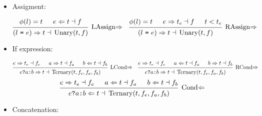 \documentclass{article}
\DeclareMathOperator{\Unary}{Unary}
\DeclareMathOperator{\Ternary}{Ternary}
\renewcommand{\S}{\ensuremath{\Rightarrow}}
\newcommand{\C}{\ensuremath{\Leftarrow}}
\newcommand{\s}[3]{#1 \S{} #2 \dashv{} #3}
\renewcommand{\c}[3]{#1 \C{} #2 \dashv{} #3}
\begin{document}
\begin{itemize}[leftmargin=*]
    \item Assigment:

          \begin{align*}
               &
              \begin{prooftree}
                  \hypo{\phi(l) = t}
                  \hypo{\c{e}{t}{f}}
                  \infer2[LAssign\S]{\s{(l~\texttt{=}~e)}{t}{\Unary(t, f)}}
              \end{prooftree}
               &
               &
              \begin{prooftree}
                  \hypo{\phi(l) = t}
                  \hypo{\s{e}{t_e}{f}}
                  \hypo{t < t_e}
                  \infer3[RAssign\S]{\s{(l~\texttt{=}~e)}{t}{\Unary(t, f)}}
              \end{prooftree}
          \end{align*}


    \item If expression:

          \begin{align*}
               &
              \begin{prooftree}
                  \hypo{\s{e}{t_e}{f_e}}
                  \hypo{\s{a}{t}{f_a}}
                  \hypo{\c{b}{t}{f_b}}
                  \infer3[LCond\S]{\s{e \texttt{?} a \texttt{:} b}{t}{\Ternary(t, f_e, f_a, f_b)}}
              \end{prooftree}
               &
               &
              \begin{prooftree}
                  \hypo{\s{e}{t_e}{f_e}}
                  \hypo{\c{a}{t}{f_a}}
                  \hypo{\s{b}{t}{f_b}}
                  \infer3[RCond\S]{\s{e \texttt{?} a \texttt{:} b}{t}{\Ternary(t, f_e, f_a, f_b)}}
              \end{prooftree}
          \end{align*}
          \vspace*{.5em}
          \begin{equation*}
              \begin{prooftree}
                  \hypo{\s{e}{t_e}{f_e}}
                  \hypo{\c{a}{t}{f_a}}
                  \hypo{\c{b}{t}{f_b}}
                  \infer3[Cond\C]{\c{e \texttt{?} a \texttt{:} b}{t}{\Ternary(t, f_e, f_a, f_b)}}
              \end{prooftree}
          \end{equation*}


    \item Concatenation:


\end{itemize}
\end{document}
